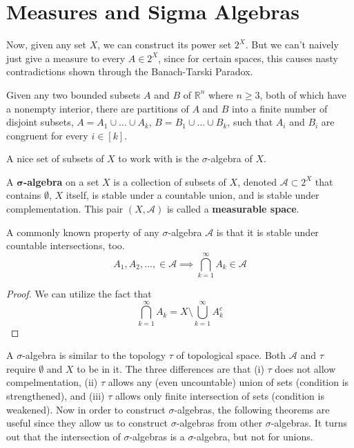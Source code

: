 \section{Measures and Sigma Algebras}

  Now, given any set $X$, we can construct its power set $2^X$. But we can't naively just give a measure to every $A \in 2^X$, since for certain spaces, this causes nasty contradictions shown through the Banach-Tarski Paradox. 

  \begin{theorem}
    Given any two bounded subsets $A$ and $B$ of $\mathbb{R}^n$ where $n \geq 3$, both of which have a nonempty interior, there are partitions of $A$ and $B$ into a finite number of disjoint subsets, $A = A_1 \cup \ldots \cup A_k$, $B = B_1 \cup \ldots \cup B_k$, such that $A_i$ and $B_i$ are congruent for every $i \in [k]$. 
  \end{theorem}

  A nice set of subsets of $X$ to work with is the $\sigma$-algebra of $X$. 

  \begin{definition}
    A \textbf{$\boldsymbol{\sigma}$-algebra} on a set $X$ is a collection  of subsets of $X$, denoted $\mathcal{A} \subset 2^X$ that contains $\emptyset$, $X$ itself, is stable under a countable union, and is stable under complementation. This pair $(X, \mathcal{A})$ is called a \textbf{measurable space}. 
  \end{definition}

  \begin{lemma}
    A commonly known property of any $\sigma$-algebra $\mathcal{A}$ is that it is stable under countable intersections, too. 
    \begin{equation}
      A_1, A_2, \ldots, \in \mathcal{A} \implies \bigcap_{k=1}^\infty A_k \in \mathcal{A}
    \end{equation}
  \end{lemma}
  \begin{proof}
    We can utilize the fact that 
    \begin{equation}
      \bigcap_{k=1}^\infty A_k = X \setminus \bigcup_{k=1}^\infty A_k^c
    \end{equation}
  \end{proof}

  A $\sigma$-algebra is similar to the topology $\tau$ of topological space. Both $\mathcal{A}$ and $\tau$ require $\emptyset$ and $X$ to be in it. The three differences are that (i) $\tau$ does not allow compelmentation, (ii) $\tau$ allows any (even uncountable) union of sets (condition is strengthened), and (iii) $\tau$ allows only finite intersection of sets (condition is weakened). Now in order to construct $\sigma$-algebras, the following theorems are useful since they allow us to construct $\sigma$-algebras from other $\sigma$-algebras. It turns out that the intersection of $\sigma$-algebras is a $\sigma$-algebra, but not for unions. 

